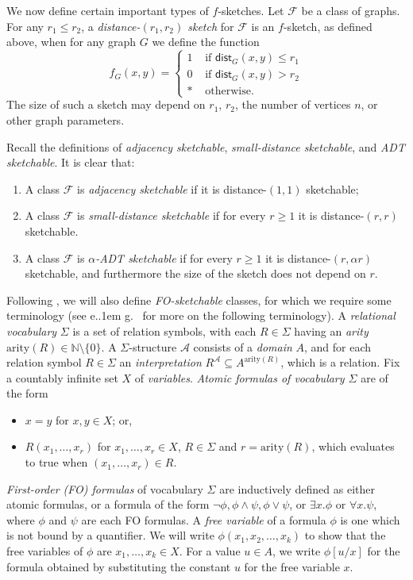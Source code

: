 \documentclass[11pt]{article}
\newcommand*\eg{e.\kern.1em g.\ }
\theoremstyle{definition}
\renewcommand{\leq}{\leqslant}
\renewcommand{\geq}{\geqslant}
\def\F {{\mathcal F}}
\def\A {{\mathcal A}}
\def\bN{{\mathbb N}}
\newcommand{\dist}{\mathsf{dist}}
\begin{document}
\noindent
We now define certain important types of $f$-sketches.  Let $\F$ be a class of graphs. For any $r_1
\leq r_2$, a \emph{distance-$(r_1,r_2)$ sketch} for $\F$ is an $f$-sketch, as defined above, when
for any graph $G$ we define the function
\[
  f_G(x,y) = \begin{cases}
    1 &\text{ if } \dist_G(x,y) \leq r_1 \\
    0 &\text{ if } \dist_G(x,y) > r_2 \\
    * &\text{ otherwise.}
  \end{cases}
\]
\noindent
The size of such a sketch may depend on $r_1$, $r_2$, the number of vertices $n$, or other graph
parameters.

Recall the definitions of \emph{adjacency sketchable}, \emph{small-distance sketchable}, and
\emph{ADT sketchable}. It is clear that:
\begin{enumerate}
\item A class $\F$ is \emph{adjacency sketchable} if it is distance-$(1,1)$ sketchable;
\item A class $\F$ is \emph{small-distance sketchable} if for every $r \geq 1$ it is
distance-$(r,r)$ sketchable.
\item A class $\F$ is \emph{$\alpha$-ADT sketchable} if for every $r \geq 1$ it is
distance-$(r,\alpha r)$ sketchable, and furthermore the size of the sketch does not depend on $r$.
\end{enumerate}

\noindent
Following \cite{HWZ21}, we will also define \emph{FO-sketchable} classes, for which we require some
terminology (see \eg \cite{NOS22} for more on the following terminology). A \emph{relational
vocabulary} $\Sigma$ is a set of relation symbols, with each $R \in \Sigma$ having an \emph{arity}
$\mathrm{arity}(R) \in \bN\setminus \{0\}$. A $\Sigma$-structure $\A$ consists of a \emph{domain}
$A$, and for each relation symbol $R \in \Sigma$ an \emph{interpretation} $R^{\A} \subseteq
A^{\mathrm{arity}(R)}$, which is a relation. Fix a countably infinite set $X$ of \emph{variables}.
\emph{Atomic formulas of vocabulary $\Sigma$} are of the form
\begin{itemize}
\item $x=y$ for $x,y \in X$; or,
\item $R(x_1, \dotsc, x_r)$ for $x_1,\dotsc, x_r \in X$, $R \in \Sigma$ and $r=\mathrm{arity}(R)$,
which evaluates to true when $(x_1, \dotsc, x_r) \in R$.
\end{itemize}
\emph{First-order (FO) formulas} of vocabulary $\Sigma$ are inductively defined as either atomic
formulas, or a formula of the form $\neg \phi, \phi \wedge \psi, \phi \vee \psi$, or $\exists x .
\phi$ or $\forall x . \psi$, where $\phi$ and $\psi$ are each FO formulas. A \emph{free variable} of
a formula $\phi$ is one which is not bound by a quantifier. We will write $\phi(x_1, x_2, \dotsc,
x_k)$ to show that the free variables of $\phi$ are $x_1, \dotsc, x_k \in X$. For a value $u \in A$,
we write $\phi[ u / x ]$ for the formula obtained by substituting the constant $u$ for the free
variable $x$.
\end{document}
